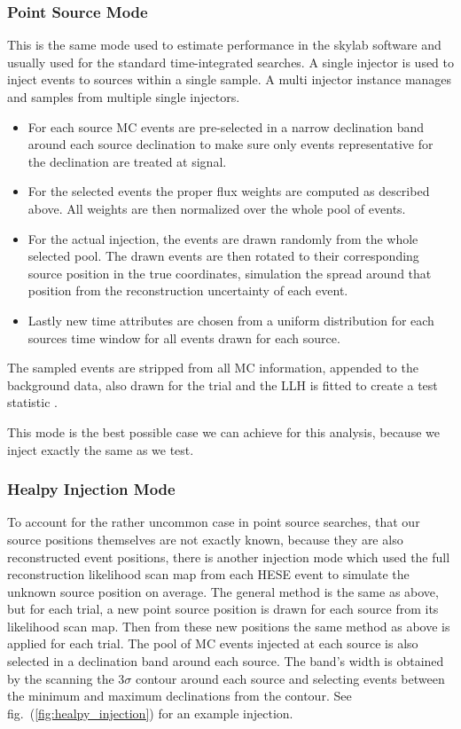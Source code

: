 \subsubsection*{Point Source Mode}
This is the same mode used to estimate performance in the skylab software and usually used for the standard time-integrated searches.
A single injector is used to inject events to sources within a single sample.
A multi injector instance manages and samples from multiple single injectors.
\begin{itemize}
  \item For each source MC events are pre-selected in a narrow declination band around each source declination to make sure only events representative for the declination are treated at signal.
  \item For the selected events the proper flux weights are computed as described above.
  All weights are then normalized over the whole pool of events.
  \item For the actual injection, the events are drawn randomly from the whole selected pool.
  The drawn events are then rotated to their corresponding source position in the true coordinates, simulation the spread around that position from the reconstruction uncertainty of each event.
  \item Lastly new time attributes are chosen from a uniform distribution for each sources time window for all events drawn for each source.
\end{itemize}
The sampled events are stripped from all MC information, appended to the background data, also drawn for the trial and the LLH is fitted to create a test statistic .

This mode is the best possible case we can achieve for this analysis, because we inject exactly the same as we test.

\subsubsection*{Healpy Injection Mode}
To account for the rather uncommon case in point source searches, that our source positions themselves are not exactly known, because they are also reconstructed event positions, there is another injection mode which used the full reconstruction likelihood scan map from each HESE event to simulate the unknown source position on average.
The general method is the same as above, but for each trial, a new point source position is drawn for each source from its likelihood scan map.
Then from these new positions the same method as above is applied for each trial.
The pool of MC events injected at each source is also selected in a declination band around each source.
The band's width is obtained by the scanning the $3\sigma$ contour around each source and selecting events between the minimum and maximum declinations from the contour.
See fig.~(\ref{fig:healpy_injection}) for an example injection.

